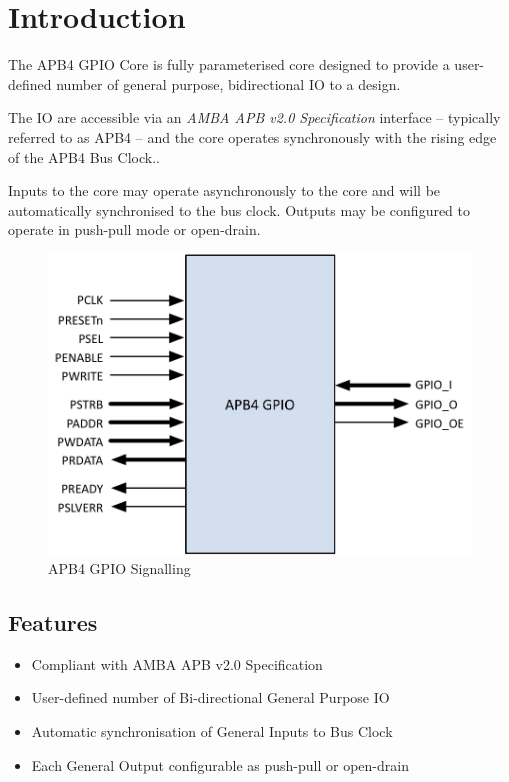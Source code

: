 \chapter{Introduction} \label{introduction}

The APB4 GPIO Core is fully parameterised core designed to provide a
user-defined number of general purpose, bidirectional IO to a design.

The IO are accessible via an \emph{AMBA APB v2.0 Specification}
interface -- typically referred to as APB4 -- and the core operates
synchronously with the rising edge of the APB4 Bus Clock..

Inputs to the core may operate asynchronously to the core and will be
automatically synchronised to the bus clock. Outputs may be configured
to operate in push-pull mode or open-drain.

\begin{figure}[tbh]
	\centering
	\includegraphics{assets/img/apb4-gpio-sig.png}
	\caption{APB4 GPIO Signalling}
	\label{fig:apb4-gpio-sig}
\end{figure}

\section{Features}\label{features}

\begin{itemize}
\item
  Compliant with AMBA APB v2.0 Specification
\item
  User-defined number of Bi-directional General Purpose IO
\item
  Automatic synchronisation of General Inputs to Bus Clock
\item
  Each General Output configurable as push-pull or open-drain
\end{itemize}

